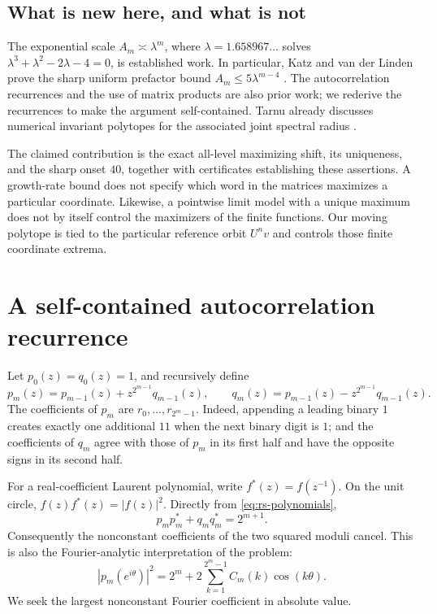 \documentclass[11pt,a4paper]{article}
\theoremstyle{definition}\newtheorem{definition}[theorem]{Definition}
\theoremstyle{remark}\newtheorem{remark}[theorem]{Remark}
\begin{document}
\subsection{What is new here, and what is not}
The exponential scale $A_m\asymp\lambda^m$, where
$\lambda=1.658967\ldots$ solves $\lambda^3+\lambda^2-2\lambda-4=0$, is
established work. In particular, Katz and van der Linden prove the sharp
uniform prefactor bound $A_m\le5\lambda^{m-4}$
\citep{KatzLinden2022}. The autocorrelation recurrences and the use of
matrix products are also prior work; we rederive the recurrences to make the
argument self-contained. Tarnu already discusses numerical invariant
polytopes for the associated joint spectral radius
\citep[Section~3]{Tarnu2023}.

The claimed contribution is the exact all-level maximizing shift, its
uniqueness, and the sharp onset $40$, together with certificates establishing
these assertions. A growth-rate bound does not specify which word in the
matrices maximizes a particular coordinate. Likewise, a pointwise limit model
with a unique maximum does not by itself control the maximizers of the finite
functions. Our moving polytope is tied to the particular reference orbit
$U^n v$ and controls those finite coordinate extrema.

\section{A self-contained autocorrelation recurrence}
\label{sec:recurrence}

Let $p_0(z)=q_0(z)=1$, and recursively define
\begin{equation}
 p_m(z)=p_{m-1}(z)+z^{2^{m-1}}q_{m-1}(z),\qquad
 q_m(z)=p_{m-1}(z)-z^{2^{m-1}}q_{m-1}(z).
 \label{eq:rs-polynomials}
\end{equation}
The coefficients of $p_m$ are $r_0,\ldots,r_{2^m-1}$. Indeed, appending a
leading binary $1$ creates exactly one additional $11$ when the next binary
digit is $1$; and the coefficients of $q_m$ agree with those of $p_m$ in its
first half and have the opposite signs in its second half.

For a real-coefficient Laurent polynomial, write $f^*(z)=f(z^{-1})$.
On the unit circle, $f(z)f^*(z)=|f(z)|^2$. Directly from
\eqref{eq:rs-polynomials},
\begin{equation}
 p_m p_m^*+q_m q_m^*=2^{m+1}.
 \label{eq:complementarity}
\end{equation}
Consequently the nonconstant coefficients of the two squared moduli cancel.
This is also the Fourier-analytic interpretation of the problem:
\begin{equation}
 |p_m(e^{i\theta})|^2
 =2^m+2\sum_{k=1}^{2^m-1}C_m(k)\cos(k\theta).
 \label{eq:fourier}
\end{equation}
We seek the largest nonconstant Fourier coefficient in absolute value.
\end{document}
